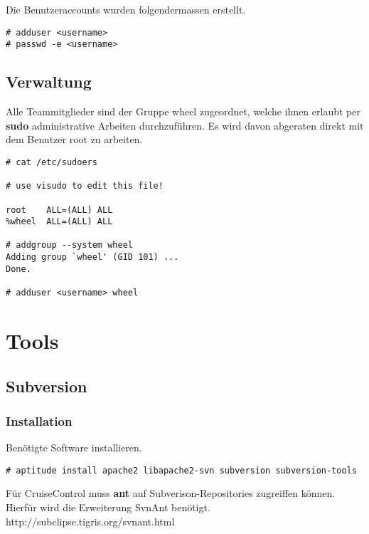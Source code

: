 \documentclass[a4paper,12pt,halfparskip,DIV14]{scrreprt}
\begin{document}
Die Benutzeraccounts wurden folgendermassen erstellt. 

\begin{verbatim}
# adduser <username>
# passwd -e <username>
\end{verbatim}


\section{Verwaltung} %
\label{sec:verwaltung}

Alle Teammitglieder sind der Gruppe wheel zugeordnet, welche ihnen erlaubt per \textbf{sudo} administrative Arbeiten durchzuführen. Es wird davon abgeraten direkt mit dem Benutzer root zu arbeiten.

\begin{verbatim}
# cat /etc/sudoers 

# use visudo to edit this file!

root    ALL=(ALL) ALL
%wheel  ALL=(ALL) ALL

# addgroup --system wheel
Adding group `wheel' (GID 101) ...
Done.

# adduser <username> wheel
\end{verbatim}




\chapter{Tools} %
\label{cha:tools}

\section{Subversion} %
\label{sec:subversion}

\subsection{Installation} %
\label{sub:installation-subversion}

Benötigte Software installieren.

\begin{verbatim}
# aptitude install apache2 libapache2-svn subversion subversion-tools
\end{verbatim}

Für CruiseControl muss \textbf{ant} auf Subverison-Repositories zugreiffen können. Hierfür wird die Erweiterung SvnAnt benötigt. http://subclipse.tigris.org/svnant.html
\end{document}
